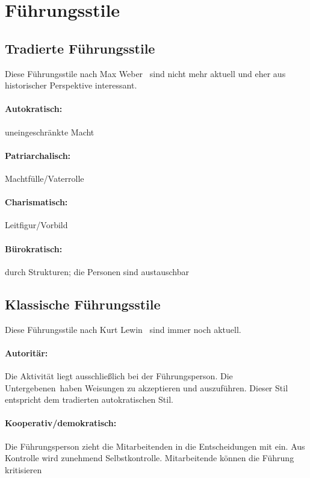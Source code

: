 \section{Führungsstile}
\label{fuehrungsstile}


\subsection{Tradierte Führungsstile}

Diese Führungsstile nach Max Weber~\cite{weber-wirtschaft-gesellschaft} sind nicht mehr aktuell und eher aus historischer Perspektive interessant.

\paragraph{Autokratisch:} uneingeschränkte Macht
\paragraph{Patriarchalisch:} Machtfülle/Vaterrolle
\paragraph{Charismatisch:} Leitfigur/Vorbild
\paragraph{Bürokratisch:} durch Strukturen; die Personen sind austauschbar


\subsection{Klassische Führungsstile}

Diese Führungsstile nach Kurt Lewin~\cite{lewin-fuehrungsstile} sind immer noch aktuell.

\paragraph{Autoritär:} Die Aktivität liegt ausschließlich bei der Führungsperson. Die \glqq Untergebenen\grqq\ haben Weisungen zu akzeptieren und auszuführen. Dieser Stil entspricht dem tradierten autokratischen Stil.

\paragraph{Kooperativ/demokratisch:} Die Führungsperson zieht die Mitarbeitenden in die Entscheidungen mit ein. Aus Kontrolle wird zunehmend Selbstkontrolle. Mitarbeitende können die Führung kritisieren

